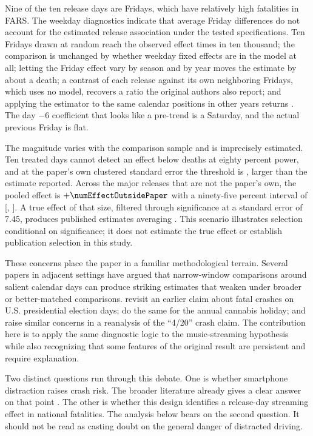 \documentclass[11pt]{article}
\begin{document}
Nine of the ten release days are Fridays, which have relatively high fatalities in FARS.
The weekday diagnostics indicate that average Friday differences do not account for the
estimated release association under the tested specifications. Ten Fridays drawn at random reach the observed effect \numFridayPlaceboDraws{} times in ten
thousand; the comparison is unchanged by whether weekday fixed effects are in the model at all;
letting the Friday effect vary by season and by year moves the estimate by about a death; a
contrast of each release against its own neighboring Fridays, which uses no model, recovers a
ratio the original authors also report; and applying the estimator to the same calendar positions
in other years returns \numEffectCalendarPlacebo{}. The day $-6$ coefficient that looks like a
pre-trend is a Saturday, and the actual previous Friday is flat.

The magnitude varies with the comparison sample and is imprecisely estimated. Ten treated days cannot detect an effect below
\numMDEEighty{} deaths at eighty percent power, and at the paper's own clustered standard error the
threshold is \numMDEEightyClustered{}, larger than the estimate reported. Across the
\numNOutsidePaper{} major releases that are not the paper's own, the pooled effect is
$+\numEffectOutsidePaper$ with a ninety-five percent interval of [\numCIOutsideLo,
\numCIOutsideHi]. A true effect of that size, filtered through significance at a standard error of
7.45, produces published estimates averaging \numMeanPublishedAtOutside{}. This scenario illustrates selection conditional on significance; it does not estimate the
true effect or establish publication selection in this study.

These concerns place the paper in a familiar methodological terrain. Several papers in adjacent settings have argued that narrow-window comparisons around salient calendar days can produce striking estimates that weaken under broader or better-matched comparisons. \citet{zhang2016election} revisit an earlier claim about fatal crashes on U.S. presidential election days; \citet{palayew2019cannabis} do the same for the annual cannabis holiday; and \citet{brown2018reexamining} raise similar concerns in a reanalysis of the ``4/20'' crash claim. The contribution here is to apply the same diagnostic logic to the music-streaming hypothesis while also recognizing that some features of the original result are persistent and require explanation.

Two distinct questions run through this debate. One is whether smartphone distraction raises crash risk. The broader literature already gives a clear answer on that point \citep{klauer2006impact,regan2011driver,dingus2016crash,nhtsa2013visual}. The other is whether this design identifies a release-day streaming effect in national fatalities. The analysis below bears on the second question. It should not be read as casting doubt on the general danger of distracted driving.
\end{document}
